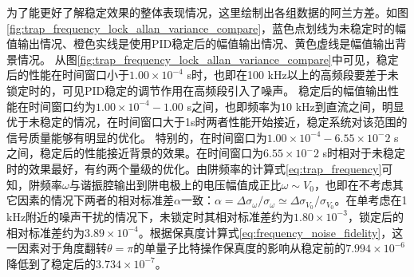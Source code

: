 为了能更好了解稳定效果的整体表现情况，这里绘制出各组数据的阿兰方差。如图\ref{fig:trap_frequency_lock_allan_variance_compare}，蓝色点划线为未稳定时的幅值输出情况、橙色实线是使用PID稳定后的幅值输出情况、黄色虚线是幅值输出背景情况。
从图\ref{fig:trap_frequency_lock_allan_variance_compare}中可见，稳定后的性能在时间窗口小于$1.00\times 10^{-4}$ s时，也即在100 kHz以上的高频段要差于未锁定时的，可见PID稳定的调节作用在高频段引入了噪声。
稳定后的幅值输出性能在时间窗口约为$1.00\times 10^{-4}-1.00$ s之间，也即频率为10 kHz到直流之间，明显优于未稳定的情况，在时间窗口大于1s时两者性能开始接近，稳定系统对该范围的信号质量能够有明显的优化。
特别的，在时间窗口为$1.00\times 10^{-4}-6.55\times 10^-2$ s之间，稳定后的性能接近背景的效果。在时间窗口为$6.55\times 10^-2$ s时相对于未稳定时的效果最好，有约两个量级的优化。由阱频率的计算式\eqref{eq:trap_frequency}可知，阱频率$\omega$与谐振腔输出到阱电极上的电压幅值成正比$\omega\sim V_0$，也即在不考虑其它因素的情况下两者的相对标准差$\alpha$一致：$\alpha=\Delta\sigma_{\omega}/\sigma_{\omega}\simeq\Delta\sigma_{V_0}/\sigma_{V_0}$。在单考虑在1 kHz附近的噪声干扰的情况下，未锁定时其相对标准差约为$1.80\times10^{-3}$，锁定后的相对标准差约为$3.89\times10^{-4}$。根据保真度计算式\eqref{eq:frequency_noise_fidelity}，这一因素对于角度翻转$\theta=\pi$的单量子比特操作保真度的影响从稳定前的$7.994\times10^{-6}$降低到了稳定后的$3.734\times10^{-7}$。









